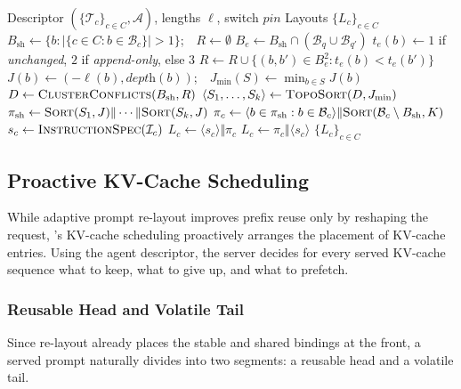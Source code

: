 \begin{algorithm}[t]
\caption{Layout decision algorithm}
\label{alg:layout}
\begin{algorithmic}[1]
\Require Descriptor $(\{\mathcal{T}_c\}_{c\in C},\mathcal{A})$, lengths $\ell$, switch $\textit{pin}$
\Ensure Layouts $\{L_c\}_{c\in C}$
\State $B_{\mathrm{sh}} \gets \{b : |\{c\in C : b\in\mathcal{B}_c\}| > 1\}$;\ \ $R \gets \emptyset$
  \State $B_e \gets B_{\mathrm{sh}}\cap(\mathcal{B}_q\cup\mathcal{B}_{q'})$
  \State $t_e(b) \gets 1$ if \textit{unchanged}, $2$ if \textit{append-only}, else $3$
  \State $R \gets R\cup\{(b,b')\in B_e^2 : t_e(b)<t_e(b')\}$
\EndFor
\State $J(b) \gets (-\ell(b),\textit{depth}(b))$;\ \ $J_{\min}(S) \gets \min_{b\in S}J(b)$
\State $D \gets \Call{ClusterConflicts}{B_{\mathrm{sh}},R}$
\State $\langle S_1,\dots,S_k\rangle \gets \Call{TopoSort}{D,J_{\min}}$ 
\State $\pi_{\mathrm{sh}} \gets \Call{Sort}{S_1,J}\Vert\cdots\Vert\Call{Sort}{S_k,J}$
  \State $\pi_c \gets \langle b\in\pi_{\mathrm{sh}} : b\in\mathcal{B}_c\rangle\Vert\Call{Sort}{\mathcal{B}_c\setminus B_{\mathrm{sh}},K}$
  \State $s_c \gets \Call{InstructionSpec}{\mathcal{I}_c}$
  \State $L_c \gets \langle s_c\rangle \Vert \pi_c$
   $L_c \gets \pi_c \Vert \langle s_c\rangle$
  \EndIf
\EndFor
\State \Return $\{L_c\}_{c\in C}$
\end{algorithmic}
\end{algorithm}


\subsection{Proactive KV-Cache Scheduling}
\label{sec:Proactive KV-Cache Scheduling}
While adaptive prompt re-layout improves prefix reuse only by reshaping the request, \sysname's KV-cache scheduling proactively arranges the placement of KV-cache entries. Using the agent descriptor, the server decides for every served KV-cache sequence what to keep, what to give up, and what to prefetch.

\subsubsection{Reusable Head and Volatile Tail}
\label{sec:identify_reusable_kv}
Since re-layout already places the stable and shared bindings at the front, a served prompt naturally divides into two segments: a reusable head and a volatile tail. 

